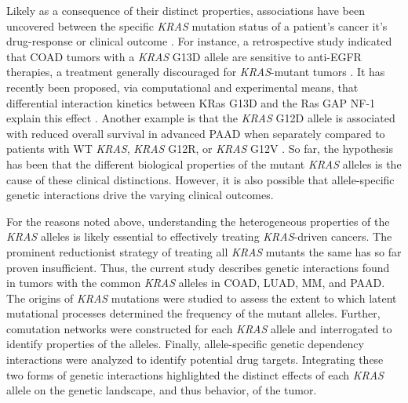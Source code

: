 \documentclass[english, 10pt, letterpaper]{article}
\newcommand{\KRAS}{\emph{KRAS}}
\newcommand{\kras}{KRas}
\begin{document}
Likely as a consequence of their distinct properties, associations have been uncovered between the specific \KRAS{} mutation status of a patient's cancer it's drug-response or clinical outcome \cite{Haigis2017, Li2018}.
For instance, a retrospective study indicated that COAD tumors with a \KRAS{} G13D allele are sensitive to anti-EGFR therapies, a treatment generally discouraged for \KRAS{}-mutant tumors \cite{DeRoock2010}. 
It has recently been proposed, via computational and experimental means, that differential interaction kinetics between \kras{} G13D and the Ras GAP NF-1 explain this effect \cite{McFall2019, Rabara2019, Zafra2019}.
Another example is that the \KRAS{} G12D allele is associated with reduced overall survival in advanced PAAD when separately compared to patients with WT \KRAS{}, \KRAS{} G12R, or \KRAS{} G12V \cite{Bournet2016}.
So far, the hypothesis has been that the different biological properties of the mutant \KRAS{} alleles is the cause of these clinical distinctions.
However, it is also possible that allele-specific genetic interactions drive the varying clinical outcomes.


For the reasons noted above, understanding the heterogeneous properties of the \KRAS{} alleles is likely essential to effectively treating \KRAS{}-driven cancers.
The prominent reductionist strategy of treating all \KRAS{} mutants the same has so far proven insufficient.
Thus, the current study describes genetic interactions found in tumors with the common \KRAS{} alleles in COAD, LUAD, MM, and PAAD.
The origins of \KRAS{} mutations were studied to assess the extent to which latent mutational processes determined the frequency of the mutant alleles.
Further, comutation networks were constructed for each \KRAS{} allele and interrogated to identify properties of the alleles.
Finally, allele-specific genetic dependency interactions were analyzed to identify potential drug targets.
Integrating these two forms of genetic interactions highlighted the distinct effects of each \KRAS{} allele on the genetic landscape, and thus behavior, of the tumor.
\end{document}
